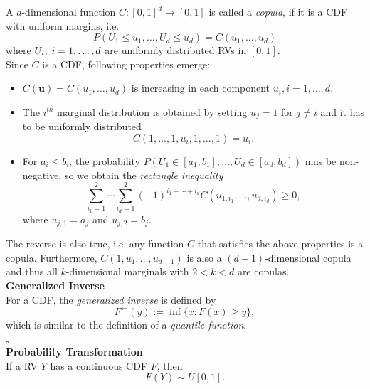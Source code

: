 
A $d$-dimensional function $C: [0,1]^d \rightarrow [0,1]$ is called a \textit{copula}, if it is a \ac{CDF} with uniform margins, i.e.
\begin{equation*}
P\left(U_{1} \leq u_{1}, \ldots, U_{d} \leq u_{d}\right)=C\left(u_{1}, \ldots, u_{d}\right)
\end{equation*}
where 
$ U_{i}, \hspace{0.25em} i = 1, \ldots, d $ 
are uniformly distributed \acp{RV} in $[0,1]$.\\
Since $C$ is a \ac{CDF}, following properties emerge:
\begin{itemize}
\item $C(\mathbf{u})=C\left(u_{1}, \ldots, u_{d}\right)$ is increasing in each component $u_i, i = 1, \ldots, d$.
\item The $i^{th}$ marginal distribution is obtained by setting $u_j = 1$ for $j \neq i$ and it has to be uniformly distributed $$C\left(1, \ldots, 1, u_{i}, 1, \ldots, 1\right)=u_{i}.$$
\item For $a_i \leq b_i$, the probability $P\left(U_{1} \in\left[a_{1}, b_{1}\right], \ldots, U_{d} \in\left[a_{d}, b_{d}\right]\right)$ mus be non-negative, so we obtain the \textit{rectangle inequality} 
\begin{equation}
\sum_{i_{1}=1}^{2} \cdots \sum_{i_{d}=1}^{2}(-1)^{i_{1}+\cdots+i_{d}} C\left(u_{1, i_{1}}, \ldots, u_{d, i_{d}}\right) \geq 0,
\end{equation}
where $u_{j,1} = a_j$ and $u_{j,2} = b_j$.
\label{eq:rectangle_inequality}
\end{itemize}
The reverse is also true, i.e. any function $C$ that satisfies the above properties is a copula. Furthermore, $C\left(1, u_{1}, \ldots, u_{d-1}\right)$ is also a $(d-1)$-dimensional copula and thus all $k$-dimensional marginals with $2<k<d$ are copulas.\\ 

\textbf{Generalized Inverse}\\
For a \ac{CDF}, the \textit{generalized inverse} is defined by
$$
F^{\leftarrow}(y):=\inf \{x: F(x) \geq y\},
\label{eq:generalized_inverse}
$$
which is similar to the definition of a \textit{quantile function}.

\hfill $\square$ \\

\textbf{Probability Transformation}\\
If a \ac{RV} $Y$ has a continuous \ac{CDF} $F$, then
\begin{equation}
F(Y) \sim U[0,1].
\label{eq:probability_transformation}
\end{equation}

